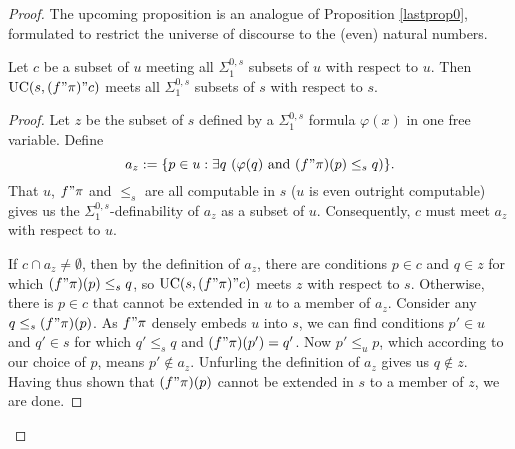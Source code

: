 \documentclass[12pt]{article}
\numberwithin{equation}{section}
\begin{document}
\begin{proof}
The upcoming proposition is an analogue of Proposition \ref{lastprop0}, formulated to restrict the universe of discourse to the (even) natural numbers. 

\begin{prop}\label{lastprop}
Let $c$ be a subset of $u$ meeting all $\Sigma^{0, s}_1$ subsets of $u$ with respect to $u$. Then $\mathrm{UC}(s, (f" \pi)" c)$ meets all $\Sigma^{0, s}_1$ subsets of $s$ with respect to $s$.
\end{prop}

\begin{proof}
Let $z$ be the subset of $s$ defined by a $\Sigma^{0, s}_1$ formula $\varphi(x)$ in one free variable. Define $$a_z := \{p \in u : \exists q \ (\varphi(q) \text{ and } (f" \pi)(p) \leq_s q)\} \text{.}$$ That $u$, $f" \pi$ and $\leq_s$ are all computable in $s$ ($u$ is even outright computable) gives us the $\Sigma^{0, s}_1$-definability of $a_z$ as a subset of $u$. Consequently, $c$ must meet $a_z$ with respect to $u$.

If $c \cap a_z \neq \emptyset$, then by the definition of $a_z$, there are conditions $p \in c$ and $q \in z$ for which $(f" \pi)(p) \leq_s q$, so $\mathrm{UC}(s, (f" \pi)" c)$ meets $z$ with respect to $s$. Otherwise, there is $p \in c$ that cannot be extended in $u$ to a member of $a_z$. Consider any $q \leq_s (f" \pi)(p)$. As $f" \pi$ densely embeds $u$ into $s$, we can find conditions $p' \in u$ and $q' \in s$ for which $q' \leq_s q$ and $(f" \pi)(p') = q'$. Now $p' \leq_u p$, which according to our choice of $p$, means $p' \not\in a_z$. Unfurling the definition of $a_z$ gives us $q \not\in z$. Having thus shown that $(f" \pi)(p)$ cannot be extended in $s$ to a member of $z$, we are done.
\end{proof}


\end{proof}
\end{document}
